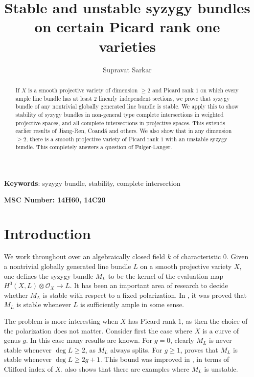 \documentclass[11pt,letterpaper]{amsart}
\title{Stable and unstable syzygy bundles on certain Picard rank one varieties}
\author{\small{Supravat Sarkar}}
\date{}
\begin{document}
\begin{abstract}
   If $X$ is a smooth projective variety of dimension $\geq 2$ and Picard rank $1$ on which every ample line bundle has at least $2$ linearly independent sections, we prove that syzygy bundle of any nontrivial globally generated line bundle is stable. We apply this to show stability of syzygy bundles in non-general type complete intersections in weighted projective spaces, and all complete intersections in projective spaces. This extends earlier results of Jiang-Ren, Coand{\u{a}} and others. We also show that in any dimension $\geq 2$, there is a smooth projective variety of Picard rank $1$ with an unstable syzygy bundle. This completely answers a question of Fulger-Langer.
\end{abstract}
\maketitle
\begin{center}
\textbf{Keywords}: syzygy bundle, stability, complete intersection 
\end{center}
\begin{center}
\textbf{MSC Number: 14H60, 14C20} 
\end{center}

\section{Introduction}
We work throughout over an algebraically closed field $k$ of characteristic $0$. Given a nontrivial globally generated line bundle $L$ on a smooth projective variety $X$, one defines the syzygy bundle $M_L$ to be the kernel of the evaluation map $H^0(X,L)\otimes \mathcal{O}_X\to L.$ It has been an important area of research to decide whether $M_L$ is stable with respect to a fixed polarization. In \cite{ein2013stability}, it was proved that $M_L$ is stable whenever $L$ is sufficiently ample in some sense. 

The problem is more interesting when $X$ has Picard rank $1$, as then the choice of the polarization does not matter. Consider first the case where $X$ is a curve of genus $g$. In this case many results are known. For $g=0$, clearly $M_L$ is never stable whenever $\deg L\geq 2$, as $M_L$ always splits.  For $g\geq 1$, \cite{ein1992stability} proves that $M_L$ is stable whenever $\deg L\geq 2g+1$. This bound was improved in \cite{camere2008stability}, in terms of Clifford index of $X$. \cite{camere2008stability} also shows that there are examples where $M_L$ is unstable. 
\end{document}
